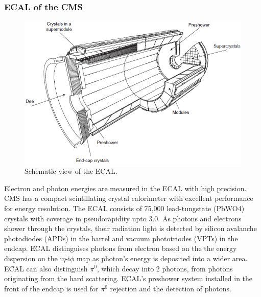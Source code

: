 \subsubsection{ECAL of the CMS}
\begin{figure}[h!]
  \caption{Schematic view of the ECAL. \cite{ecal}}
  \label{fig:ECAL}
  \centering
  \includegraphics[width=0.87\linewidth]{figs/ECAL.png}
\end{figure}
Electron and photon energies are measured in the ECAL with high precision. 
CMS has a compact scintillating crystal calorimeter with excellent performance for energy resolution.
The ECAL consists of 75,000 lead-tungstate (PbWO4) crystals with coverage in pseudorapidity upto 3.0. As photons and electrons shower through the crystals, their radiation light is detected by silicon avalanche photodiodes (APDs) in the barrel and vacuum phototriodes (VPTs) in the endcap.
ECAL distinguises photons from electron based on the the energy dispersion on the i$\eta$-i$\phi$ map as photon's energy is deposited into a wider area.
ECAL can also distinguish $\pi^{0}$, which decay into 2 photons, from photons originating from the hard scattering.
ECAL's preshower system installed in the front of the endcap is used for $\pi^{0}$ rejection and the detection of photons. 

